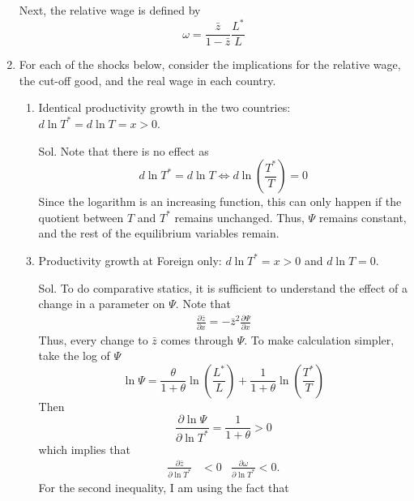 \documentclass{article}
\begin{document}
\begin{enumerate}
    Next, the relative wage is defined by 
    \begin{equation}
        \omega = \frac{\bar{z}}{1-\bar{z}} \frac{L^*}{L}
    \end{equation}
    \item For each of the shocks below, consider the implications for the relative wage, the cut-off good, and the real wage in each country.
    \begin{enumerate}
        \item Identical productivity growth in the two countries: $d \ln T^*=d \ln T=x>0$.
        \item[Sol.] Note that there is no effect as 
        \begin{equation*}
            d\ln T^*=d\ln T \Longleftrightarrow d\ln\left(\frac{T^*}{T}\right) = 0
        \end{equation*}
        Since the logarithm is an increasing function, this can only happen if the quotient between $T$ and $T^*$ remains unchanged. Thus, $\Psi$ remains constant, and the rest of the equilibrium variables remain.  
        \item Productivity growth at Foreign only: $d \ln T^*=x>0$ and $d \ln T=0$.
        \item[Sol.] To do comparative statics, it is sufficient to understand the effect of a change in a parameter on $\Psi$. Note that
        \begin{align*}
            \frac{\partial \bar{z}}{\partial x} = -\bar{z}^2\frac{\partial\Psi}{\partial x}
        \end{align*}
        Thus, every change to $\bar{z}$ comes through $\Psi$. To make calculation simpler, take the log of $\Psi$
        \begin{equation}\label{ps1:q1:lnPsi}
            \ln\Psi = \frac{\theta}{1+\theta}\ln\left(\frac{L^*}{L}\right) + \frac{1}{1+\theta}\ln\left(\frac{T^*}{T}\right)
        \end{equation}
        Then 
        \begin{equation*}
            \frac{\partial\ln\Psi}{\partial\ln T^*} = \frac{1}{1+\theta}>0
        \end{equation*}
        which implies that 
        \begin{align*}
            \frac{\partial \bar{z}}{\partial\ln T^*} &<0 & \frac{\partial \omega }{\partial \ln T^*} < 0. 
        \end{align*}
        For the second inequality, I am using the fact that 
        \begin{equation*}

\end{equation*}
\end{enumerate}
\end{enumerate}
\end{document}
